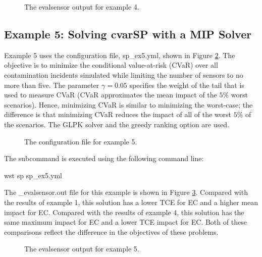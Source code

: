 \begin{figure}[h]
  \caption{The evalsensor output for  example 4.}
  \label{fig:sp_ex4_evalsensor}
\end{figure}



\FloatBarrier 
\subsection{Example 5: Solving cvarSP with a MIP Solver}
\label{sp_example5}

Example 5 uses the configuration file, sp\_ex5.yml, shown in Figure
\ref{fig:sp_ex5}. The objective is to minimize the conditional
value-at-risk (CVaR) over all contamination incidents simulated
while limiting the number of sensors to no more than five. The
parameter $\gamma = 0.05$ specifies the weight of the tail that is
used to measure CVaR (CVaR approximates the mean impact of the
$5\%$ worst scenarios). Hence, minimizing CVaR is similar to
minimizing the worst-case; the difference is that minimizing CVaR
reduces the impact of all of the worst $5\%$ of the scenarios. 
The GLPK solver and the greedy ranking option are used.

\begin{figure}[h]
  \caption{The  configuration file for example 5.}
  \label{fig:sp_ex5}
\end{figure}

The  subcommand is executed using the following command line:

\begin{unknownListing}
wst sp sp_ex5.yml
\end{unknownListing}

The {\outputprefix}\_evalsensor.out file for this example is shown in Figure
\ref{fig:sp_ex5_evalsensor}. Compared with the results of example 1, this
solution has a lower TCE for EC and a higher mean impact for EC.
Compared with the results of example 4, this solution has the same maximum
impact for EC and a lower TCE impact for EC. Both of these comparisons
reflect the difference in the objectives of these problems.

\begin{figure}[h]
  \caption{The evalsensor output for  example 5.}
  \label{fig:sp_ex5_evalsensor}
\end{figure}



